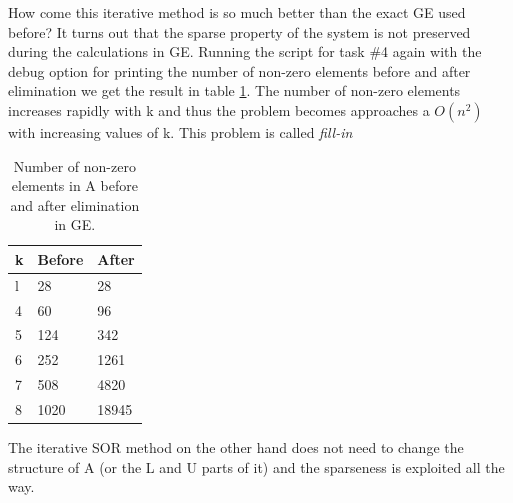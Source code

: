 \documentclass[10pt, a4paper]{article}
\begin{document}
How come this iterative method is so much better than the exact GE used before? It turns out that the sparse property of the system is not preserved during the calculations in GE. Running the script for task \#4 again with the debug option for printing the number of non-zero elements before and after elimination we get the result in table \ref{table+nnz}. The number of non-zero elements increases rapidly with k and thus the problem becomes approaches a $O(n^2)$ with increasing values of k. This problem is called \emph{fill-in} \cite{sparsemat}

\begin{table}[h]
\begin{center}
\begin{tabular}{l | l l}
k & Before & After \\ \hline
l & 28     & 28    \\
4 & 60     & 96    \\
5 & 124    & 342   \\
6 & 252    & 1261  \\
7 & 508    & 4820  \\
8 & 1020   & 18945 \\
\end{tabular}
\caption{Number of non-zero elements in A before and after elimination in GE.}
\end{center}
\label{table+nnz}
\end{table}

The iterative SOR method on the other hand does not need to change the structure of A (or the L and U parts of it) and the sparseness is exploited all the way.
\end{document}
